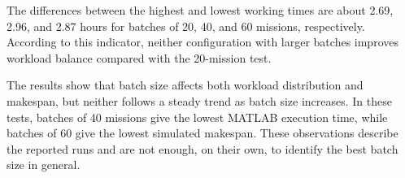 The differences between the highest and lowest working times are about 2.69, 2.96, and 2.87 hours for batches of 20, 40, and 60 missions, respectively. According to this indicator, neither configuration with larger batches improves workload balance compared with the 20-mission test.

The results show that batch size affects both workload distribution and makespan, but neither follows a steady trend as batch size increases. In these tests, batches of 40 missions give the lowest MATLAB execution time, while batches of 60 give the lowest simulated makespan. These observations describe the reported runs and are not enough, on their own, to identify the best batch size in general.
